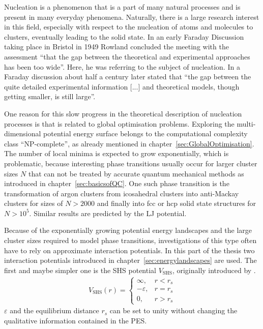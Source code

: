Nucleation is a phenomenon that is a part of many natural processes and is
present in many everyday phenomena. Naturally, there is a large research
interest in this field, especially with respect to the nucleation of atoms and
molecules to clusters, eventually leading to the solid
state.\autocite{Stillinger_Packingstructurestransitions_1984,
Martin-1996,Wales-1996, Vlieg_atomicscaleunderstandingcrystal_2007, Arkus-2010,
Woodley-2010, Karthika-2016, Holmes-Cerfon_StickySphereClusters_2017} In an
early Faraday Discussion taking place in Bristol in 1949 Rowland concluded the
meeting with the assessment ``that the gap between the theoretical and
experimental approaches has been too wide''.\autocite{Rowland-1949} Here, he was
referring to the subject of nucleation. In a Faraday discussion about half a
century later \citeauthor{Vlieg_atomicscaleunderstandingcrystal_2007} stated
that ``the gap between the quite detailed experimental information [...] and
theoretical models, though getting smaller, is still
large''.\autocite{Vlieg_atomicscaleunderstandingcrystal_2007}

One reason for this slow progress in the theoretical description of nucleation
processes is that is related to global optimisation problems. Exploring the
multi-dimensional potential energy surface belongs to the computational
complexity class ``NP-complete'', as already mentioned in
chapter~\ref{sec:GlobalOptimisation}. The number of local minima is expected to
grow exponentially,\autocite{Stillinger_Packingstructurestransitions_1984,
Oganov-2006, Massen_Powerlawdistributionsareas_2007, wales10, Oganov-2011,
calvo12, Wales-2015} which is problematic, because interesting phase transitions
usually occur for larger cluster sizes $N$ that can not be treated by accurate
quantum mechanical methods as introduced in chapter~\ref{sec:basicsofQC}. One
such phase transition is the transformation of argon clusters from icosahedral
clusters into anti-Mackay clusters for sizes of $N>2000$ and finally into
\acf{fcc} or \acf{hcp} solid state structures for
$N>10^5$.\autocite{Krainyukova-2012} Similar results are predicted by the
\acf{LJ} potential.\autocite{Martin-1996,
Schwerdtfeger_ExtensionLennardJonespotential_2006, Krainyukova-2007}

Because of the exponentially growing potential energy landscapes and the large
cluster sizes required to model phase transitions, investigations of this type
often have to rely on approximate interaction potentials. In this part of the
thesis two interaction potentials introduced in
chapter~\ref{sec:energylandscapes} are used. The first and maybe simpler one is
the \acf{SHS} potential $V_\mathrm{SHS}$, originally introduced by
\citeauthor{baxter68}\autocite{baxter68}.
%
\begin{align}
    V_\mathrm{SHS}(r)=\begin{cases}
        \infty, & r < r_s\\
        -\varepsilon, & r = r_s\\
        0, & r > r_s
    \end{cases}
\label{eqn:KS}
\end{align}
%
$\varepsilon$ and the equilibrium distance $r_s$ can be set to unity without
changing the qualitative information contained in the \ac{PES}. 


